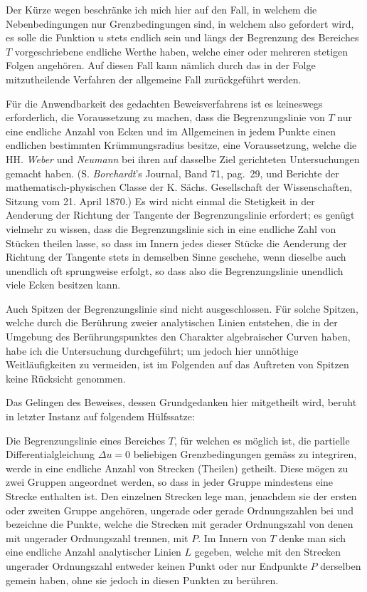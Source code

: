 \documentclass{article}
\begin{document}
Der Kürze wegen beschränke ich mich hier auf den Fall, in welchem die Nebenbedingungen nur Grenzbedingungen sind, in welchem also gefordert wird, es solle die Funktion $u$ stets endlich sein und längs der Begrenzung des Bereiches $T$ vorgeschriebene endliche Werthe haben, welche einer oder mehreren stetigen Folgen angehören. Auf diesen Fall kann nämlich durch das in der Folge mitzutheilende Verfahren der allgemeine Fall zurückgeführt werden.

Für die Anwendbarkeit des gedachten Beweisverfahrens ist es keineswegs erforderlich, die Voraussetzung zu machen, dass die Begrenzungslinie von $T$ nur eine endliche Anzahl von Ecken und im Allgemeinen in jedem Punkte einen endlichen bestimmten Krümmungsradius besitze, eine Voraussetzung, welche die HH. \emph{Weber} und \emph{Neumann} bei ihren auf dasselbe Ziel gerichteten Untersuchungen gemacht haben. (S. \emph{Borchardt}'s Journal, Band 71, pag.~29, und
Berichte der mathematisch-physischen Classe der K. Sächs. Gesellschaft der Wissenschaften, Sitzung vom 21. April 1870.) Es wird nicht einmal die Stetigkeit in der Aenderung der Richtung der Tangente der Begrenzungslinie erfordert; es genügt vielmehr zu wissen, dass die Begrenzungslinie sich in eine endliche Zahl von Stücken theilen lasse, so dass im Innern jedes dieser Stücke die Aenderung der Richtung der Tangente stets in demselben Sinne geschehe, wenn dieselbe auch unendlich oft sprungweise erfolgt, so dass also die Begrenzungslinie unendlich viele Ecken besitzen kann.

Auch Spitzen der Begrenzungslinie sind nicht ausgeschlossen. Für solche Spitzen, welche durch die Berührung zweier analytischen Linien entstehen, die in der Umgebung des Berührungspunktes den Charakter algebraischer Curven haben, habe ich die Untersuchung durchgeführt; um jedoch hier unnöthige Weitläufigkeiten zu vermeiden, ist im Folgenden auf das Auftreten von Spitzen keine Rücksicht genommen.

Das Gelingen des Beweises, dessen Grundgedanken hier mitgetheilt wird, beruht in letzter Instanz auf folgendem Hülfssatze:

Die Begrenzungslinie eines Bereiches $T$, für welchen es möglich ist, die partielle Differentialgleichung $\Delta u = 0$ beliebigen Grenzbedingungen gemäss zu integriren, werde in eine endliche Anzahl von Strecken (Theilen) getheilt. Diese mögen zu zwei Gruppen angeordnet werden, so dass in jeder Gruppe mindestens eine Strecke enthalten ist. Den einzelnen Strecken lege man, jenachdem sie der ersten oder zweiten Gruppe angehören, ungerade oder gerade Ordnungszahlen
bei und bezeichne die Punkte, welche die Strecken mit gerader Ordnungszahl von denen mit ungerader Ordnungszahl trennen, mit $P$. Im Innern von $T$ denke man sich eine endliche Anzahl analytischer Linien $L$ gegeben, welche mit den Strecken ungerader Ordnungszahl entweder keinen Punkt oder nur Endpunkte $P$ derselben gemein haben, ohne sie jedoch in diesen Punkten zu berühren.
\end{document}

